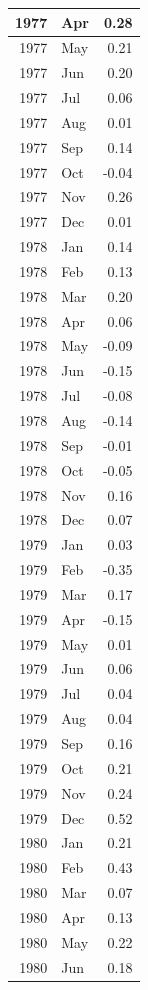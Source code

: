 \documentclass[
]{article}
\begin{document}
\begin{table}[H]
\begin{tabular}[t]{r|l|r}
\hline
1977 & Apr & 0.28\\
\hline
1977 & May & 0.21\\
\hline
1977 & Jun & 0.20\\
\hline
1977 & Jul & 0.06\\
\hline
1977 & Aug & 0.01\\
\hline
1977 & Sep & 0.14\\
\hline
1977 & Oct & -0.04\\
\hline
1977 & Nov & 0.26\\
\hline
1977 & Dec & 0.01\\
\hline
1978 & Jan & 0.14\\
\hline
1978 & Feb & 0.13\\
\hline
1978 & Mar & 0.20\\
\hline
1978 & Apr & 0.06\\
\hline
1978 & May & -0.09\\
\hline
1978 & Jun & -0.15\\
\hline
1978 & Jul & -0.08\\
\hline
1978 & Aug & -0.14\\
\hline
1978 & Sep & -0.01\\
\hline
1978 & Oct & -0.05\\
\hline
1978 & Nov & 0.16\\
\hline
1978 & Dec & 0.07\\
\hline
1979 & Jan & 0.03\\
\hline
1979 & Feb & -0.35\\
\hline
1979 & Mar & 0.17\\
\hline
1979 & Apr & -0.15\\
\hline
1979 & May & 0.01\\
\hline
1979 & Jun & 0.06\\
\hline
1979 & Jul & 0.04\\
\hline
1979 & Aug & 0.04\\
\hline
1979 & Sep & 0.16\\
\hline
1979 & Oct & 0.21\\
\hline
1979 & Nov & 0.24\\
\hline
1979 & Dec & 0.52\\
\hline
1980 & Jan & 0.21\\
\hline
1980 & Feb & 0.43\\
\hline
1980 & Mar & 0.07\\
\hline
1980 & Apr & 0.13\\
\hline
1980 & May & 0.22\\
\hline
1980 & Jun & 0.18\\

\end{tabular}
\end{table}
\end{document}
